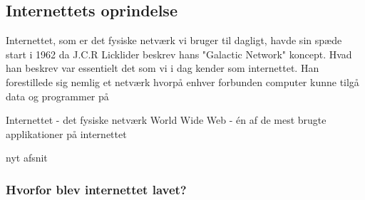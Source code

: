 \subsection{Internettets oprindelse}
Internettet, som er det fysiske netværk vi bruger til dagligt, havde sin spæde start i 1962 da J.C.R Licklider beskrev hans "Galactic Network" koncept. Hvad han beskrev var essentielt det som vi i dag kender som internettet. Han forestillede sig nemlig et netværk hvorpå enhver forbunden computer kunne tilgå data og programmer på 
\newline

Internettet - det fysiske netværk\newline
World Wide Web - én af de mest brugte applikationer på internettet

nyt afsnit
\subsubsection{Hvorfor blev internettet lavet?}
